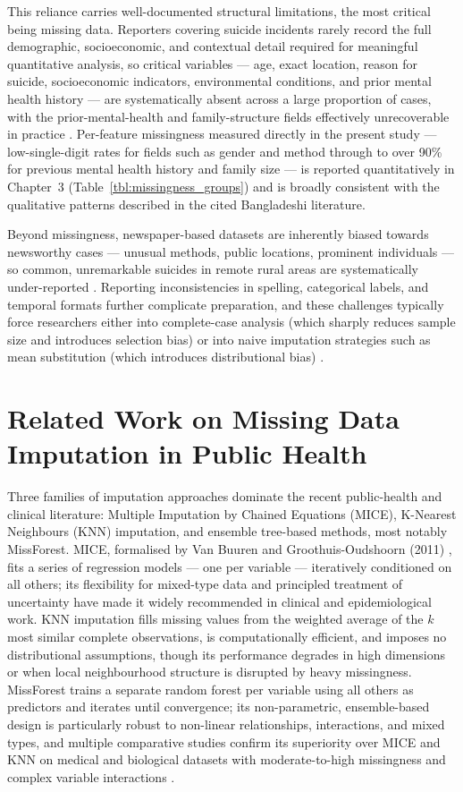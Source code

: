This reliance carries well-documented structural limitations, the most critical being missing data. Reporters covering suicide incidents rarely record the full demographic, socioeconomic, and contextual detail required for meaningful quantitative analysis, so critical variables --- age, exact location, reason for suicide, socioeconomic indicators, environmental conditions, and prior mental health history --- are systematically absent across a large proportion of cases, with the prior-mental-health and family-structure fields effectively unrecoverable in practice \cite{ref51,ref1,ref50,ref29}. Per-feature missingness measured directly in the present study --- low-single-digit rates for fields such as gender and method through to over 90\% for previous mental health history and family size --- is reported quantitatively in Chapter~3 (Table~\ref{tbl:missingness_groups}) and is broadly consistent with the qualitative patterns described in the cited Bangladeshi literature.

Beyond missingness, newspaper-based datasets are inherently biased towards newsworthy cases --- unusual methods, public locations, prominent individuals --- so common, unremarkable suicides in remote rural areas are systematically under-reported \cite{ref23}. Reporting inconsistencies in spelling, categorical labels, and temporal formats further complicate preparation, and these challenges typically force researchers either into complete-case analysis (which sharply reduces sample size and introduces selection bias) or into naive imputation strategies such as mean substitution (which introduces distributional bias) \cite{ref6,ref55}.

\section{Related Work on Missing Data Imputation in Public Health}

Three families of imputation approaches dominate the recent public-health and clinical literature: Multiple Imputation by Chained Equations (MICE), K-Nearest Neighbours (KNN) imputation, and ensemble tree-based methods, most notably MissForest. MICE, formalised by Van Buuren and Groothuis-Oudshoorn (2011) \cite{ref10}, fits a series of regression models --- one per variable --- iteratively conditioned on all others; its flexibility for mixed-type data and principled treatment of uncertainty have made it widely recommended in clinical and epidemiological work. KNN imputation \cite{ref11} fills missing values from the weighted average of the $k$ most similar complete observations, is computationally efficient, and imposes no distributional assumptions, though its performance degrades in high dimensions or when local neighbourhood structure is disrupted by heavy missingness. MissForest \cite{ref12} trains a separate random forest per variable using all others as predictors and iterates until convergence; its non-parametric, ensemble-based design is particularly robust to non-linear relationships, interactions, and mixed types, and multiple comparative studies confirm its superiority over MICE and KNN on medical and biological datasets with moderate-to-high missingness and complex variable interactions \cite{ref12,ref32,ref33}.

